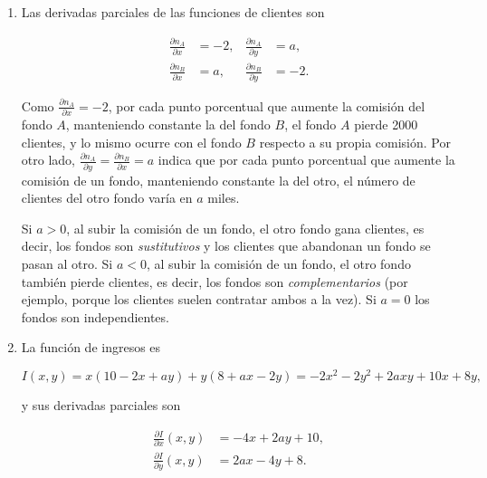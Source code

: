 \documentclass[
  spanish,
  a4paper,
]{scrreport}
\theoremstyle{definition}
\theoremstyle{remark}
\begin{document}
\begin{tcolorbox}[enhanced jigsaw, arc=.35mm, bottomrule=.15mm, bottomtitle=1mm, breakable, colback=white, colbacktitle=quarto-callout-tip-color!10!white, colframe=quarto-callout-tip-color-frame, coltitle=black, left=2mm, leftrule=.75mm, opacityback=0, opacitybacktitle=0.6, rightrule=.15mm, title=\textcolor{quarto-callout-tip-color}{\faLightbulb}\hspace{0.5em}{Solución}, titlerule=0mm, toprule=.15mm, toptitle=1mm]

\begin{enumerate}
\def\labelenumi{\alph{enumi}.}
\item
  Las derivadas parciales de las funciones de clientes son

  \begin{align*}
  \frac{\partial n_A}{\partial x} &= -2, & \frac{\partial n_A}{\partial y} &= a, \\
  \frac{\partial n_B}{\partial x} &= a, & \frac{\partial n_B}{\partial y} &= -2.
  \end{align*}

  Como \(\frac{\partial n_A}{\partial x} = -2\), por cada punto
  porcentual que aumente la comisión del fondo \(A\), manteniendo
  constante la del fondo \(B\), el fondo \(A\) pierde 2000 clientes, y
  lo mismo ocurre con el fondo \(B\) respecto a su propia comisión. Por
  otro lado,
  \(\frac{\partial n_A}{\partial y} = \frac{\partial n_B}{\partial x} = a\)
  indica que por cada punto porcentual que aumente la comisión de un
  fondo, manteniendo constante la del otro, el número de clientes del
  otro fondo varía en \(a\) miles.

  Si \(a>0\), al subir la comisión de un fondo, el otro fondo gana
  clientes, es decir, los fondos son \emph{sustitutivos} y los clientes
  que abandonan un fondo se pasan al otro. Si \(a<0\), al subir la
  comisión de un fondo, el otro fondo también pierde clientes, es decir,
  los fondos son \emph{complementarios} (por ejemplo, porque los
  clientes suelen contratar ambos a la vez). Si \(a=0\) los fondos son
  independientes.
\item
  La función de ingresos es

  \[
  I(x,y) = x(10 - 2x + ay) + y(8 + ax - 2y) = -2x^2 - 2y^2 + 2axy + 10x + 8y,
  \]

  y sus derivadas parciales son

  \begin{align*}
  \frac{\partial I}{\partial x}(x,y) &= -4x + 2ay + 10, \\
  \frac{\partial I}{\partial y}(x,y) &= 2ax - 4y + 8.
  \end{align*}


\end{enumerate}
\end{tcolorbox}
\end{document}

